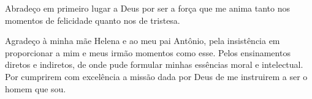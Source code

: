 \thispagestyle{empty}
%

Abradeço em primeiro lugar a Deus por ser a força que me anima tanto nos momentos de felicidade quanto nos de tristesa.

Agradeço à minha mãe Helena e ao meu pai Antônio, pela insistência em proporcionar a mim e meus irmão momentos como esse. Pelos ensinamentos diretos e indiretos, de onde pude formular minhas essências moral e intelectual. Por cumprirem com excelência a missão dada por Deus de me instruirem a ser o homem que sou.